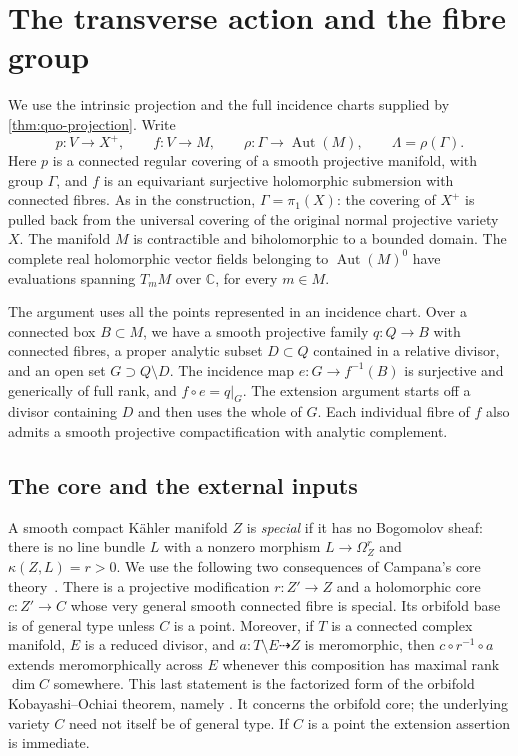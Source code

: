 \section{The transverse action and the fibre group}
\label{sec:grp-section}

We use the intrinsic projection and the full incidence charts supplied by \cref{thm:quo-projection}.  Write
\[
 p:V\longrightarrow X^+,\qquad f:V\longrightarrow M,
 \qquad \rho:\Gamma\longrightarrow\operatorname{Aut}(M),
 \qquad \Lambda=\rho(\Gamma).
\]
Here $p$ is a connected regular covering of a smooth projective manifold, with group $\Gamma$, and $f$ is an equivariant surjective holomorphic submersion with connected fibres.  As in the construction, $\Gamma=\pi_1(X)$: the covering of $X^+$ is pulled back from the universal covering of the original normal projective variety $X$. The manifold $M$ is contractible and biholomorphic to a bounded domain.  The complete real holomorphic vector fields belonging to $\operatorname{Aut}(M)^0$ have evaluations spanning $T_mM$ over $\mathbb{C}$, for every $m\in M$.

The argument uses all the points represented in an incidence chart. Over a connected box $B\subset M$, we have a smooth projective family $q:Q\to B$ with connected fibres, a proper analytic subset $D\subset Q$ contained in a relative divisor, and an open set $G\supset Q\setminus D$. The incidence map $e:G\to f^{-1}(B)$ is surjective and generically of full rank, and $f\circ e=q|_G$. The extension argument starts off a divisor containing $D$ and then uses the whole of $G$. Each individual fibre of $f$ also admits a smooth projective compactification with analytic complement.

\subsection{The core and the external inputs}

A smooth compact K\"ahler manifold $Z$ is \emph{special} if it has no Bogomolov sheaf: there is no line bundle $L$ with a nonzero morphism $L\to\Omega_Z^r$ and $\kappa(Z,L)=r>0$.  We use the following two consequences of Campana's core theory~\cite{Campana2004}. There is a projective modification $r:Z'\to Z$ and a holomorphic core $c:Z'\to C$ whose very general smooth connected fibre is special. Its orbifold base is of general type unless $C$ is a point.  Moreover, if $T$ is a connected complex manifold, $E$ is a reduced divisor, and $a:T\setminus E\dashrightarrow Z$ is meromorphic, then $c\circ r^{-1}\circ a$ extends meromorphically across $E$ whenever this composition has maximal rank $\dim C$ somewhere.  This last statement is the factorized form of the orbifold Kobayashi--Ochiai theorem, namely \cite[Theorem~8.2]{Campana2004}.  It concerns the orbifold core; the underlying variety $C$ need not itself be of general type.  If $C$ is a point the extension assertion is immediate.

